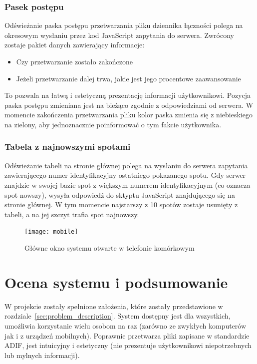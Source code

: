 \documentclass[]{mgr}
\begin{document}
            \subsection{Pasek postępu}
            Odświeżanie paska postępu przetwarzania pliku dziennika łączności polega na okresowym wysłaniu przez kod JavaScript zapytania do serwera. Zwrócony zostaje pakiet danych zawierający informacje:
            \begin{itemize}
                \item Czy przetwarzanie zostało zakończone
                \item Jeżeli przetwarzanie dalej trwa, jakie jest jego procentowe zaawansowanie
            \end{itemize}
            To pozwala na łatwą i estetyczną prezentację informacji użytkownikowi. Pozycja paska postępu zmieniana jest na bieżąco zgodnie z odpowiedziami od serwera. W momencie zakończenia przetwarzania pliku kolor paska zmienia się z niebieskiego na zielony, aby jednoznacznie poinformować o tym fakcie użytkownika.

            \subsection{Tabela z najnowszymi spotami}
            Odświeżanie tabeli na stronie głównej polega na wysłaniu do serwera zapytania zawierającego numer identyfikacyjny ostatniego pokazanego spotu. Gdy serwer znajdzie w swojej bazie spot z większym numerem identyfikacyjnym (co oznacza spot nowszy), wysyła odpowiedź do sktyptu JavaScript znajdującego się na stronie głównej. W tym momencie najstarszy z 10 spotów zostaje usunięty z tabeli, a na jej szczyt trafia spot najnowszy.

            \begin{figure}[hb!]
                \centering
                \texttt{[image: mobile]}
                \caption{Główne okno systemu otwarte w telefonie komórkowym}
                \label{fig:mobile}
            \end{figure}

    \chapter{Ocena systemu i podsumowanie}
    \label{sec:summit}
    W projekcie zostały spełnione założenia, które zostały przedstawione w rozdziale~\ref{sec:problem_description}. System dostępny jest dla wszystkich, umożliwia korzystanie wielu osobom na raz (zarówno ze zwykłych komputerów jak i z urządzeń mobilnych). Poprawnie przetwarza pliki zapisane w standardzie ADIF, jest intuicyjny i estetyczny (nie prezentuje użytkownikowi niepotrzebnych lub mylnych informacji).
\end{document}
